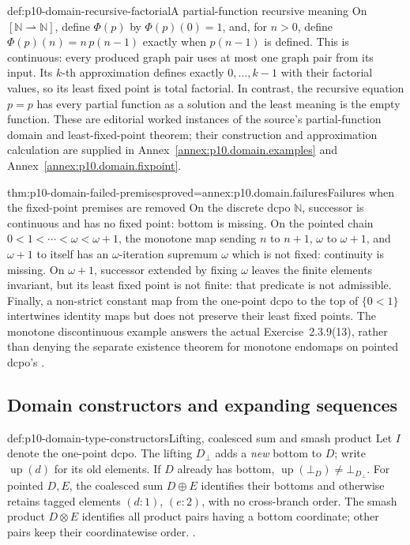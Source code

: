 \begin{hbexample}{def:p10-domain-recursive-factorial}{A partial-function recursive meaning}
On \([\mathbb N\rightharpoonup\mathbb N]\), define \(\Phi(p)\)
by \(\Phi(p)(0)=1\), and, for \(n>0\), define
\(\Phi(p)(n)=n\,p(n-1)\) exactly when \(p(n-1)\) is defined.
This is continuous: every produced graph pair uses at most one graph
pair from its input. Its \(k\)-th approximation defines exactly
\(0,\ldots,k-1\) with their factorial values, so its least fixed
point is total factorial. In contrast, the recursive equation
\(p=p\) has every partial function as a solution and the least
meaning is the empty function. These are editorial worked instances
of the source's partial-function domain and least-fixed-point theorem;
their construction and approximation calculation are supplied in
Annex~\ref{annex:p10.domain.examples} and
Annex~\ref{annex:p10.domain.fixpoint}.
\end{hbexample}

\begin{hbtheorem}{thm:p10-domain-failed-premises}{proved=annex:p10.domain.failures}{Failures when the fixed-point premises are removed}
On the discrete dcpo \(\mathbb N\), successor is continuous and
has no fixed point: bottom is missing. On the pointed chain
\(0<1<\cdots<\omega<\omega+1\), the monotone map sending
\(n\) to \(n+1\), \(\omega\) to \(\omega+1\), and
\(\omega+1\) to itself has an \(\omega\)-iteration supremum
\(\omega\) which is not fixed: continuity is missing.
On \(\omega+1\), successor extended by fixing \(\omega\) leaves
the finite elements invariant, but its least fixed point is not finite:
that predicate is not admissible. Finally, a non-strict constant map
from the one-point dcpo to the top of \(\{0<1\}\) intertwines
identity maps but does not preserve their least fixed points.
The monotone discontinuous example answers the actual
Exercise~2.3.9(13), rather than denying the separate existence theorem
for monotone endomaps on pointed dcpo's
\cite[pp.~15--17,32]{AbramskyJungCorrectedExpandedDomainTheory}.
\end{hbtheorem}

\subsection{Domain constructors and expanding sequences}

\begin{hbdefinition}{def:p10-domain-type-constructors}{Lifting, coalesced sum and smash product}
Let \(I\) denote the one-point dcpo. The lifting \(D_{\bot}\)
adds a \emph{new} bottom to \(D\);
write \(\operatorname{up}(d)\) for its old elements. If \(D\)
already has bottom, \(\operatorname{up}(\bot_D)\ne\bot_{D_{\bot}}\).
For pointed \(D,E\), the coalesced sum \(D\oplus E\) identifies
their bottoms and otherwise retains tagged elements \((d:1)\),
\((e:2)\), with no cross-branch order. The smash product
\(D\otimes E\) identifies all product pairs having a bottom
coordinate; other pairs keep their coordinatewise order.
\cite[Sections~3.2.3--5, pp.~44--45]
{AbramskyJungCorrectedExpandedDomainTheory}.
\end{hbdefinition}

